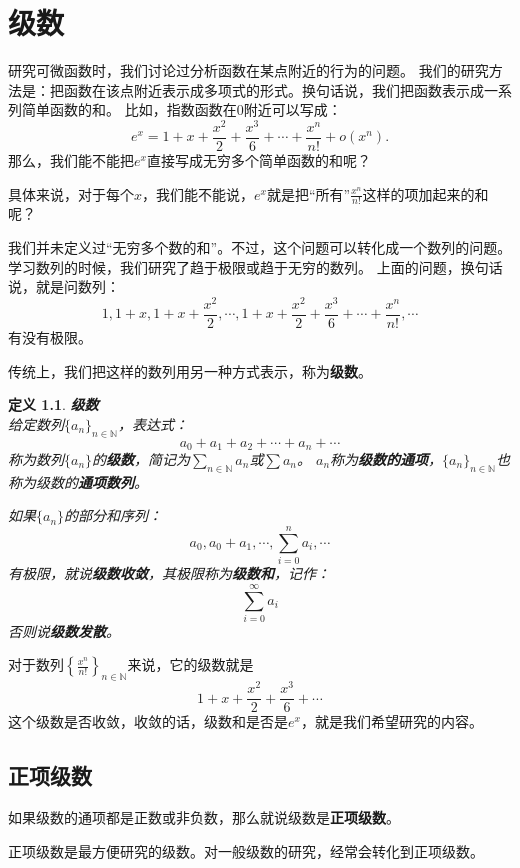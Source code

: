 \documentclass[12pt,UTF8]{ctexbook}
\newcommand{\olim}[1]{\mathit{o}\left(#1\right)}  %
\newtheorem{df}{定义}[section]
\begin{document}
\chapter{级数}
研究可微函数时，我们讨论过分析函数在某点附近的行为的问题。
我们的研究方法是：把函数在该点附近表示成多项式的形式。换句话说，我们把函数表示成一系列简单函数的和。
比如，指数函数在$0$附近可以写成：
$$e^x = 1 + x + \frac{x^2}{2} + \frac{x^3}{6} + \cdots + \frac{x^n}{n!} + \olim{x^n}.$$
那么，我们能不能把$e^x$直接写成无穷多个简单函数的和呢？

具体来说，对于每个$x$，我们能不能说，$e^x$就是把“所有”$\frac{x^n}{n!}$这样的项加起来的和呢？

我们并未定义过“无穷多个数的和”。不过，这个问题可以转化成一个数列的问题。
学习数列的时候，我们研究了趋于极限或趋于无穷的数列。
上面的问题，换句话说，就是问数列：
$$ 1, 1+x, 1+x + \frac{x^2}{2}, \cdots , 1 + x + \frac{x^2}{2} + \frac{x^3}{6} + \cdots + \frac{x^n}{n!}, \cdots $$
有没有极限。

传统上，我们把这样的数列用另一种方式表示，称为\textbf{级数}。

\begin{df}{\textbf{级数}}
    \mbox{} \\
    给定数列$\{a_n\}_{n\in\mathbb{N}}$，表达式：
    $$ a_0 + a_1 + a_2 + \cdots + a_n + \cdots $$
    称为数列$\{a_n\}$的\textbf{级数}，简记为$\sum_{n\in\mathbb{N}} a_n$或$\sum a_n$。
    $a_n$称为\textbf{级数的通项}，$\{a_n\}_{n\in\mathbb{N}}$也称为级数的\textbf{通项数列}。
    
    如果$\{a_n\}$的部分和序列：
    $$ a_0, a_0 + a_1, \cdots , \sum_{i=0}^n a_i, \cdots $$
    有极限，就说\textbf{级数收敛}，其极限称为\textbf{级数和}，记作：
    $$ \sum_{i=0}^\infty a_i $$
    否则说\textbf{级数发散}。
    
\end{df}

对于数列$\left\{\frac{x^n}{n!}\right\}_{n\in\mathbb{N}}$来说，它的级数就是
$$ 1 + x + \frac{x^2}{2} + \frac{x^3}{6} + \cdots $$
这个级数是否收敛，收敛的话，级数和是否是$e^x$，就是我们希望研究的内容。

\section{正项级数}

如果级数的通项都是正数或非负数，那么就说级数是\textbf{正项级数}。

正项级数是最方便研究的级数。对一般级数的研究，经常会转化到正项级数。
\end{document}
